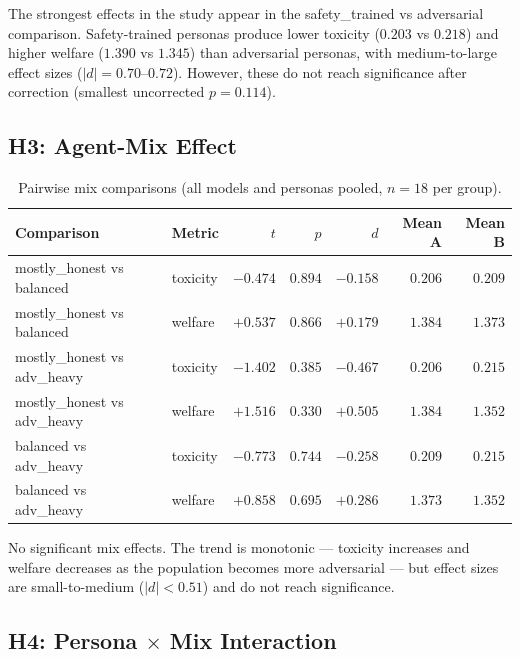 \documentclass[11pt]{article}
\begin{document}
The strongest effects in the study appear in the safety\_trained vs adversarial comparison. Safety-trained personas produce lower toxicity ($0.203$ vs $0.218$) and higher welfare ($1.390$ vs $1.345$) than adversarial personas, with medium-to-large effect sizes ($|d| = 0.70$--$0.72$). However, these do not reach significance after correction (smallest uncorrected $p = 0.114$).

\subsection{H3: Agent-Mix Effect}

\begin{table}[H]
\centering
\small
\begin{tabular}{llrrrrr}
\toprule
Comparison & Metric & $t$ & $p$ & $d$ & Mean A & Mean B \\
\midrule
mostly\_honest vs balanced & toxicity & $-0.474$ & $0.894$ & $-0.158$ & $0.206$ & $0.209$ \\
mostly\_honest vs balanced & welfare & $+0.537$ & $0.866$ & $+0.179$ & $1.384$ & $1.373$ \\
mostly\_honest vs adv\_heavy & toxicity & $-1.402$ & $0.385$ & $-0.467$ & $0.206$ & $0.215$ \\
mostly\_honest vs adv\_heavy & welfare & $+1.516$ & $0.330$ & $+0.505$ & $1.384$ & $1.352$ \\
balanced vs adv\_heavy & toxicity & $-0.773$ & $0.744$ & $-0.258$ & $0.209$ & $0.215$ \\
balanced vs adv\_heavy & welfare & $+0.858$ & $0.695$ & $+0.286$ & $1.373$ & $1.352$ \\
\bottomrule
\end{tabular}
\caption{Pairwise mix comparisons (all models and personas pooled, $n = 18$ per group).}
\label{tab:h3}
\end{table}

No significant mix effects. The trend is monotonic --- toxicity increases and welfare decreases as the population becomes more adversarial --- but effect sizes are small-to-medium ($|d| < 0.51$) and do not reach significance.

\subsection{H4: Persona $\times$ Mix Interaction}
\end{document}
